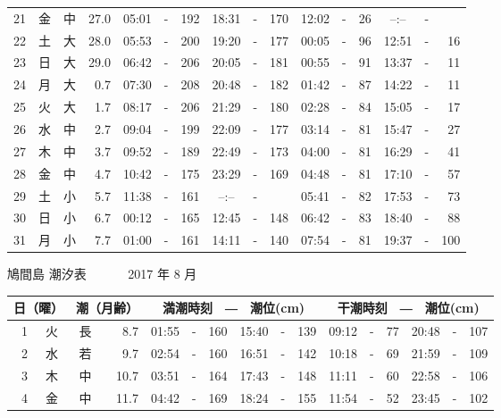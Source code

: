\documentclass[12pt.a4j]{jsarticle}
\begin{document}
\begin{center}
\begin{table}[ht]
\begin{tabular}{|rc|cr|ccrccr|ccrccr|}
21 & 金 & 中 & 27.0 &  05:01 &-& 192  &  18:31 &-& 170  &   12:02 &-&  26  &   --:-- &-&     \\
22 & 土 & 大 & 28.0 &  05:53 &-& 200  &  19:20 &-& 177  &   00:05 &-&  96  &   12:51 &-&  16  \\
23 & 日 & 大 & 29.0 &  06:42 &-& 206  &  20:05 &-& 181  &   00:55 &-&  91  &   13:37 &-&  11  \\
24 & 月 & 大 &  0.7 &  07:30 &-& 208  &  20:48 &-& 182  &   01:42 &-&  87  &   14:22 &-&  11  \\
25 & 火 & 大 &  1.7 &  08:17 &-& 206  &  21:29 &-& 180  &   02:28 &-&  84  &   15:05 &-&  17  \\
26 & 水 & 中 &  2.7 &  09:04 &-& 199  &  22:09 &-& 177  &   03:14 &-&  81  &   15:47 &-&  27  \\
27 & 木 & 中 &  3.7 &  09:52 &-& 189  &  22:49 &-& 173  &   04:00 &-&  81  &   16:29 &-&  41  \\
28 & 金 & 中 &  4.7 &  10:42 &-& 175  &  23:29 &-& 169  &   04:48 &-&  81  &   17:10 &-&  57  \\
29 & 土 & 小 &  5.7 &  11:38 &-& 161  &  --:-- &-&     &   05:41 &-&  82  &   17:53 &-&  73  \\
30 & 日 & 小 &  6.7 &  00:12 &-& 165  &  12:45 &-& 148  &   06:42 &-&  83  &   18:40 &-&  88  \\
31 & 月 & 小 &  7.7 &  01:00 &-& 161  &  14:11 &-& 140  &   07:54 &-&  81  &   19:37 &-& 100  \\
   \hline
   \end{tabular}
\end{table}
\newpage
 {\LARGE 鳩間島  潮汐表　　　}
 {\large 2017 年  8 月}\\
 \begin{table}[ht]
    \begin{tabular}{|rc|cr|ccrccr|ccrccr|}
    \hline
    \multicolumn{2}{|c|}{日（曜）} & \multicolumn{2}{c|}{潮（月齢）} & \multicolumn{6}{c|}{満潮時刻　―　潮位(cm)} & \multicolumn{6}{c|}{干潮時刻　―　潮位(cm)} \\
 \hline
 1 & 火 & 長 &  8.7 &  01:55 &-& 160  &  15:40 &-& 139  &   09:12 &-&  77  &   20:48 &-& 107  \\
 2 & 水 & 若 &  9.7 &  02:54 &-& 160  &  16:51 &-& 142  &   10:18 &-&  69  &   21:59 &-& 109  \\
 3 & 木 & 中 & 10.7 &  03:51 &-& 164  &  17:43 &-& 148  &   11:11 &-&  60  &   22:58 &-& 106  \\
 4 & 金 & 中 & 11.7 &  04:42 &-& 169  &  18:24 &-& 155  &   11:54 &-&  52  &   23:45 &-& 102  \\

\end{tabular}
\end{table}
\end{center}
\end{document}
